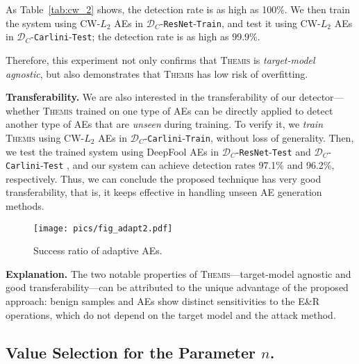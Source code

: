 \documentclass[sigconf]{acmart}
\newcommand{\oursys}{\textsc{Themis}\xspace}
\begin{document}
As Table~\ref{tab:cw_2} shows, the detection rate is as high as 100\%. We then 
train the system using CW-$L_2$ AEs in
$\mathcal{D}_C$-\texttt{ResNet}-\texttt{Train}, and test it using CW-$L_2$ AEs in $\mathcal{D}_C$-\texttt{Carlini}-\texttt{Test}; 
the detection rate is as high as 99.9\%.

Therefore, this experiment not only confirms that \oursys is \textit{target-model 
agnostic}, but also demonstrates that \oursys has low risk of overfitting.

\vspace{3pt}
\noindent \textbf{{Transferability.}}
We are also interested in the transferability of our detector---whether \oursys trained on one type of
AEs can be directly applied to detect another type of
AEs that are \emph{unseen} during training. To verify it, we \emph{train} \oursys using CW-$L_2$ AEs in 
$\mathcal{D}_C$-\texttt{Carlini}-\texttt{Train}, without loss of generality. 
Then, we test the trained system using DeepFool AEs in $\mathcal{D}_C$-\texttt{ResNet}-\texttt{Test} and 
$\mathcal{D}_C$-\texttt{Carlini}-\texttt{Test} , and our system can achieve detection rates 97.1\% and 96.2\%, respectively. 
Thus, we can conclude the proposed technique has very good transferability, that is,
it keeps effective in handling unseen AE generation methods.

\begin{figure*}[t]

\centering
\texttt{[image: pics/fig\_adapt2.pdf]}

\caption{Success ratio of adaptive AEs.}\label{fig_adapt}

\end{figure*}

\vspace{3pt}
\noindent  \textbf{{Explanation.}} The two notable properties of \oursys---target-model agnostic and
good transferability---can be attributed to the unique advantage of the proposed approach:
benign samples and 
AEs show distinct sensitivities to the E\&R operations, which
do not depend on the target model and the attack method. 

\subsection{Value Selection for the Parameter $n$.}\label{sec:n}
\end{document}
